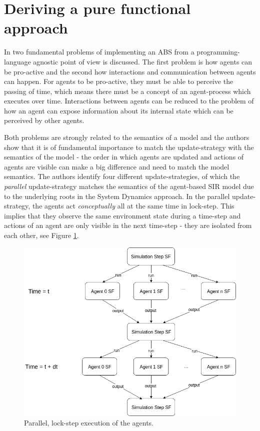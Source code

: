 \section{Deriving a pure functional approach}
\label{sec:functional_approach}

In \cite{thaler_art_2017} two fundamental problems of implementing an ABS from a programming-language agnostic point of view is discussed. The first problem is how agents can be pro-active and the second how interactions and communication between agents can happen. For agents to be pro-active, they must be able to perceive the passing of time, which means there must be a concept of an agent-process which executes over time. Interactions between agents can be reduced to the problem of how an agent can expose information about its internal state which can be perceived by other agents. 

Both problems are strongly related to the semantics of a model and the authors show that it is of fundamental importance to match the update-strategy with the semantics of the model - the order in which agents are updated and actions of agents are visible can make a big difference and need to match the model semantics. The authors identify four different update-strategies, of which the \textit{parallel} update-strategy matches the semantics of the agent-based SIR model due to the underlying roots in the System Dynamics approach. In the parallel update-strategy, the agents act \textit{conceptually} all at the same time in lock-step. This implies that they observe the same environment state during a time-step and actions of an agent are only visible in the next time-step - they are isolated from each other, see Figure \ref{fig:parallel_strategy}.

\begin{figure}
	\centering
	\includegraphics[width=.4\textwidth, angle=0]{./fig/diagrams/parallel_strategy.png}
	\caption{Parallel, lock-step execution of the agents.}
	\label{fig:parallel_strategy}
\end{figure}


